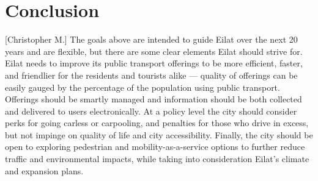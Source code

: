 \documentclass[12pt]{article}                               %
\begin{document}
\section{Conclusion}[Christopher M.]\label{sec:conclusion}
The goals above are intended to guide Eilat over the next 20 years and are flexible, but there are some clear elements Eilat should strive for. Eilat needs to improve its public transport offerings to be more efficient, faster, and friendlier for the residents and tourists alike --- quality of offerings can be easily gauged by the percentage of the population using public transport. Offerings should be smartly managed and information should be both collected and delivered to users electronically. At a policy level the city should consider perks for going carless or carpooling, and penalties for those who drive in excess, but not impinge on quality of life and city accessibility. Finally, the city should be open to exploring pedestrian and mobility-as-a-service options to further reduce traffic and environmental impacts, while taking into consideration Eilat's climate and expansion plans.


\newpage
\doublespacing


\onehalfspacing
\newpage
\end{document}
